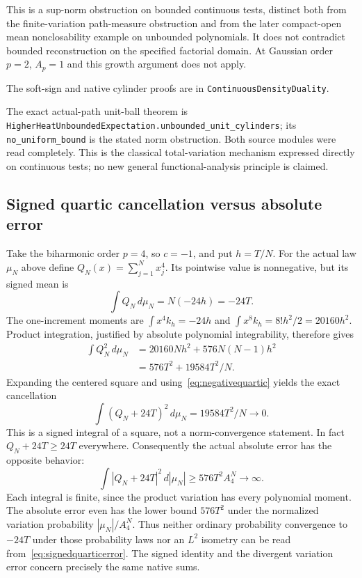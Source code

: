 \documentclass[11pt]{article}
\theoremstyle{remark}\newtheorem{remark}[theorem]{Remark}
\newcommand{\code}[1]{{\small\nolinkurl{#1}}}
\begin{document}
This is a sup-norm obstruction on bounded continuous tests, distinct
both from the finite-variation path-measure obstruction and from the
later compact-open mean nonclosability example on unbounded
polynomials. It does not contradict bounded reconstruction on the
specified factorial domain. At Gaussian order $p=2$, $A_p=1$ and
this growth argument does not apply.

\par\noindent
The soft-sign and native cylinder proofs are in
\code{ContinuousDensityDuality}.
\par\noindent
The exact actual-path unit-ball theorem is
\code{HigherHeatUnboundedExpectation.unbounded_unit_cylinders};
its \code{no_uniform_bound} is the stated norm obstruction.
Both source modules were read completely. This is the classical
total-variation mechanism expressed directly on continuous tests;
no new general functional-analysis principle is claimed.

\subsection{Signed quartic cancellation versus absolute error}
Take the biharmonic order $p=4$, so $c=-1$, and put $h=T/N$.
For the actual law $\mu_N$ above define
$Q_N(x)=\sum_{j=1}^N x_j^4$. Its pointwise value is nonnegative,
but its signed mean is
\begin{equation}\label{eq:negativequartic}
 \int Q_N\,d\mu_N=N(-24h)=-24T.
\end{equation}
The one-increment moments are
$\int x^4k_h=-24h$ and $\int x^8k_h=8!h^2/2=20160h^2$.
Product integration, justified by absolute polynomial integrability,
therefore gives
\begin{align*}
 \int Q_N^2\,d\mu_N
 &=20160Nh^2+576N(N-1)h^2\\
 &=576T^2+19584T^2/N.
\end{align*}
Expanding the centered square and using~\eqref{eq:negativequartic}
yields the exact cancellation
\begin{equation}\label{eq:signedquarticerror}
 \int(Q_N+24T)^2\,d\mu_N=19584T^2/N\longrightarrow0.
\end{equation}
This is a signed integral of a square, not a norm-convergence statement.
In fact $Q_N+24T\geq24T$ everywhere. Consequently the actual absolute
error has the opposite behavior:
\begin{equation}\label{eq:absolutequarticerror}
 \int|Q_N+24T|^2\,d|\mu_N|
 \geq576T^2 A_4^N\longrightarrow\infty.
\end{equation}
Each integral is finite, since the product variation has every
polynomial moment. The absolute error even has the lower bound
$576T^2$ under the normalized variation probability
$|\mu_N|/A_4^N$. Thus neither ordinary probability convergence to
$-24T$ under those probability laws nor an $L^2$ isometry can be
read from~\eqref{eq:signedquarticerror}. The signed identity and the
divergent variation error concern precisely the same native sums.
\end{document}
